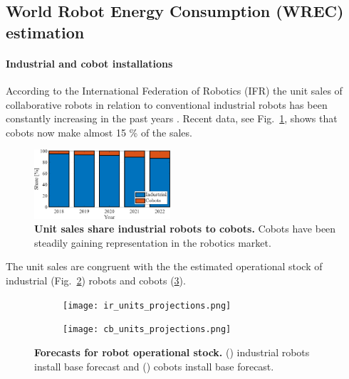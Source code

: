 \subsection{World Robot Energy Consumption (WREC) estimation}\label{sec:app_robot_ener_consumption}

\paragraph{Industrial and cobot installations}\label{sec:robot_statistics}
According to the International Federation of Robotics (IFR) the unit sales of collaborative robots in relation to conventional industrial robots has been constantly increasing in the past years \cite{statista_ir_cobot_share}. Recent data, see Fig.~\ref{fig:industrial_cobot_share}, shows that cobots now make almost 15 \% of the sales.
\begin{figure}[!h]
	\centering
	\includegraphics[width= 0.45\textwidth]{fig/share_industrial_and_cobots.png} 
	\caption{\textbf{Unit sales share industrial robots to cobots.} Cobots have been steadily gaining representation in the robotics market.}
	\label{fig:industrial_cobot_share}
\end{figure}

The unit sales are congruent with the the estimated operational stock of industrial (Fig.~\ref{fig:ir_stock}) robots and cobots (\ref{fig:cobot_stock}).
\begin{figure}[t!]
	\centering
	\hspace*{\fill}
	\begin{subfigure}[b]{0.45\textwidth}
		\subcaption{}
		\texttt{[image: ir\_units\_projections.png]}
		\label{fig:ir_stock}
	\end{subfigure}
	\hfill
	\begin{subfigure}[b]{0.45\textwidth}
		\subcaption{}
		\texttt{[image: cb\_units\_projections.png]}
		\label{fig:cobot_stock}
	\end{subfigure}
	\hspace*{\fill}	
	\caption[] {\label{fig:robot_forecasts} \textbf{Forecasts for robot operational stock.} () industrial robots install base forecast and () cobots install base forecast.}	
\end{figure}


